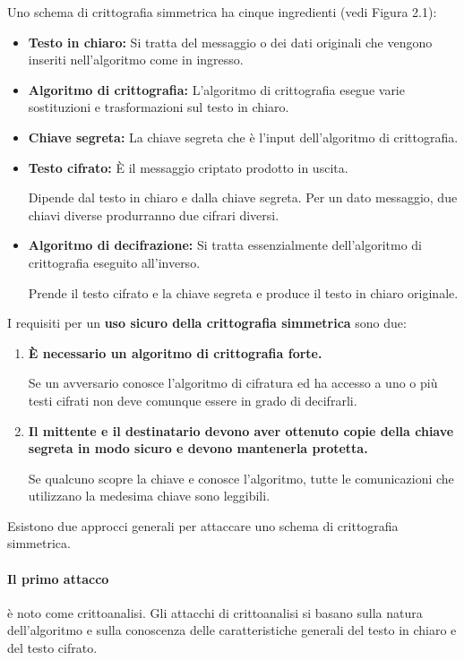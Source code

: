 Uno schema di crittografia simmetrica ha cinque ingredienti (vedi Figura 2.1):
\begin{itemize}
    \item \textbf{Testo in chiaro:} Si tratta del messaggio o dei dati originali che vengono inseriti nell'algoritmo come in ingresso.
    
    \item \textbf{Algoritmo di crittografia:} L'algoritmo di crittografia esegue varie sostituzioni e trasformazioni sul testo in chiaro.
    
    \item \textbf{Chiave segreta:} La chiave segreta che è l'input dell'algoritmo di crittografia. 
    
    \item \textbf{Testo cifrato:} È il messaggio criptato prodotto in uscita. 
    
    Dipende dal testo in chiaro e dalla chiave segreta. Per un dato messaggio, due chiavi diverse produrranno due cifrari diversi.
    
   \item \textbf{Algoritmo di decifrazione:} Si tratta essenzialmente dell'algoritmo di crittografia eseguito  all'inverso. 
    
    Prende il testo cifrato e la chiave segreta e produce il testo in chiaro originale.
\end{itemize}
\newpage
I requisiti per un \textbf{uso sicuro della crittografia simmetrica} sono due:
\begin{enumerate}
    \item \textbf{È necessario un algoritmo di crittografia forte.}
    
   Se un avversario conosce l'algoritmo di cifratura ed ha accesso a uno o più testi cifrati non deve comunque essere in grado di decifrarli.
    
    \item \textbf{Il mittente e il destinatario devono aver ottenuto copie della chiave segreta in modo sicuro e devono mantenerla protetta.}
    
    Se qualcuno scopre la chiave e conosce l'algoritmo, tutte le comunicazioni che utilizzano la medesima chiave sono leggibili.
\end{enumerate}
Esistono due approcci generali per attaccare uno schema di crittografia simmetrica.
\paragraph{Il primo attacco} è noto come crittoanalisi. Gli attacchi di crittoanalisi si basano sulla natura dell'algoritmo e sulla conoscenza delle caratteristiche generali del testo in chiaro e del testo cifrato. 

